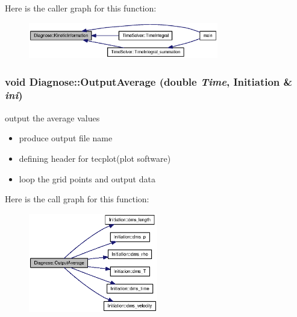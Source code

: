 Here is the caller graph for this function:\nopagebreak
\begin{figure}[H]
\begin{center}
\leavevmode
\includegraphics[width=235pt]{classDiagnose_9c73b32dc8facce488617780250c14bf_icgraph}
\end{center}
\end{figure}
\hypertarget{classDiagnose_dc46dd26362f94e09b956b3affa247c9}{
\subsubsection[{OutputAverage}]{\setlength{\rightskip}{0pt plus 5cm}void Diagnose::OutputAverage (double {\em Time}, \/  {\bf Initiation} \& {\em ini})}}
\label{classDiagnose_dc46dd26362f94e09b956b3affa247c9}


output the average values 



\begin{itemize}
\item produce output file name\end{itemize}


\begin{itemize}
\item defining header for tecplot(plot software)\end{itemize}


\begin{itemize}
\item loop the grid points and output data \end{itemize}


Here is the call graph for this function:\nopagebreak
\begin{figure}[H]
\begin{center}
\leavevmode
\includegraphics[width=160pt]{classDiagnose_dc46dd26362f94e09b956b3affa247c9_cgraph}
\end{center}
\end{figure}


